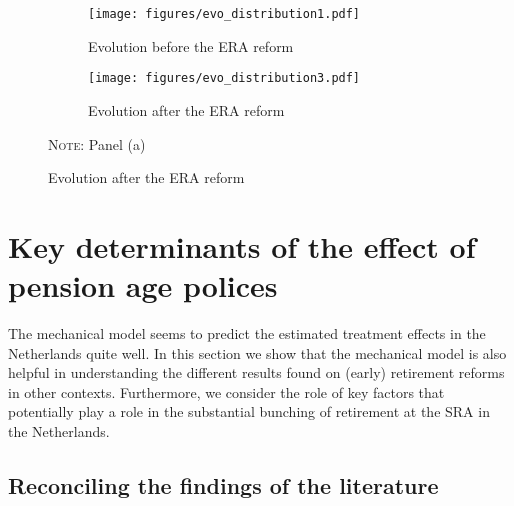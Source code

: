 \documentclass[12pt,a4paper]{article}
\begin{document}
\vspace{0.2cm}
\begin{figure}[H]
\begin{adjustwidth}{-1.1in}{-1in}
	\caption{Effect of SRA reform on the distribution of retirement age}
	\label{distribution_comparison}
	\centering
	\begin{subfigure}{.7\textwidth}
		\centering
		\caption{Evolution before the ERA reform}
		\texttt{[image: figures/evo\_distribution1.pdf]} %
		\label{rd_comparison1}
	\end{subfigure}%
	\begin{subfigure}{.7\textwidth}
		\centering
		\caption{Evolution after the ERA reform}
		\texttt{[image: figures/evo\_distribution3.pdf]} 	
		\label{rd_comparison2}
	\end{subfigure}
	\begin{minipage}{15cm}%
		\footnotesize
		\begin{minipage}{15cm}%
			\footnotesize
			\textsc{Note:} Panel (a) 
		\end{minipage}%
	\end{minipage}%
 \end{adjustwidth}
\end{figure}

\section{Key determinants of the effect of pension age polices}\label{channels}

The mechanical model seems to predict the estimated treatment effects in the Netherlands quite well. In this section we show that the mechanical model is also helpful in understanding the different results found on (early) retirement reforms in other contexts. Furthermore, we consider the role of key factors that potentially play a role in the substantial bunching of retirement at the SRA in the Netherlands.

\subsection{Reconciling the findings of the literature}
\end{document}
